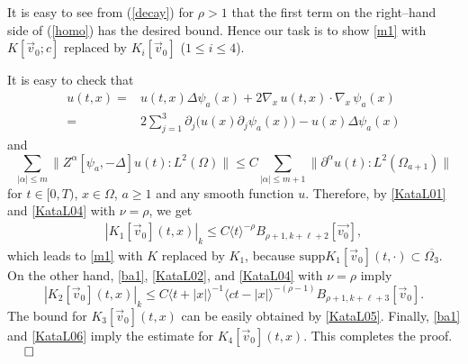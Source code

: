 \documentclass[12pt]{amsart}
\newcommand{\pa}{\partial}
\numberwithin{equation}{section}
\begin{document}
It is easy to see from (\ref{decay}) for $\rho>1$ that the first term on the
right--hand side of (\ref{homo}) has the desired bound.
Hence our task is to show \eqref{m1} with $K[\vec{v}_0; c]$ replaced by
$K_i[\vec{v}_0]$ ($1\le i\le 4$).

It is easy to check that
\begin{align*}
[\psi_a,-\Delta]u(t,x)= &
   u(t,x) \Delta \psi_a(x)+2\nabla_{\!x}\, u(t,x) \cdot \nabla_{\!x}\, \psi_a(x)\\
=& 2\sum_{j=1}^3 \pa_j\bigl(u(x)\pa_j \psi_a(x)\bigr)-u(x)\Delta\psi_a(x)
\end{align*}
and
\begin{equation*}
\sum_{|\alpha| \le m} \|Z^\alpha
    [\psi_a,-\Delta]u(t)\!:\!L^2(\Omega)\| \le C
\sum_{|\alpha| \le m+1} \|\partial^\alpha u(t)\!:\!L^2(\Omega_{a+1})\|
\end{equation*}
for $t \in [0,T)$, $x \in \Omega$, $a \ge 1$ and any smooth function $u$.
Therefore, by \eqref{KataL01} and \eqref{KataL04} with $\nu=\rho$, we get
\begin{eqnarray*}
|K_1[\vec{v}_0](t,x)|_k \le C\langle t \rangle^{-\rho}
B_{\rho+1, k+\ell+2}[\vec{v_0}],
\end{eqnarray*}
which leads to \eqref{m1} with $K$ replaced by $K_1$,
because
$\text{supp} K_1[\vec{v}_0](t,\cdot) \subset \overline{\Omega_3}$.
On the other hand, \eqref{ba1}, \eqref{KataL02}, and \eqref{KataL04}
with $\nu=\rho$
imply
$$
|K_2[\vec{v}_0](t,x)|_k\le C \langle t+|x|\rangle^{-1} 
\langle ct-|x| \rangle^{-(\rho-1)}
B_{\rho+1, k+\ell+3}[\vec{v}_0].
$$
The bound for $K_3[\vec{v}_0](t,x)$ can be easily obtained by \eqref{KataL05}.
Finally, \eqref{ba1} and \eqref{KataL06} imply the estimate for  
$K_4[\vec{v}_0](t,x)$.
This completes the proof. \hfill$\qed$
\end{document}

